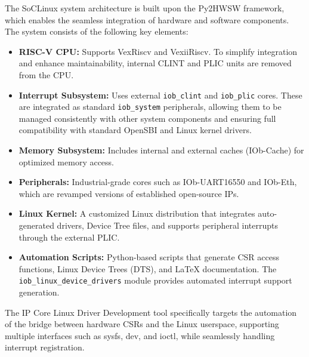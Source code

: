 %

The SoCLinux system architecture is built upon the Py2HWSW framework, which enables the seamless integration of hardware and software components. The system consists of the following key elements:

\begin{itemize}
    \item \textbf{RISC-V CPU:} Supports VexRiscv and VexiiRiscv. To simplify integration and enhance maintainability, internal CLINT and PLIC units are removed from the CPU.
    \item \textbf{Interrupt Subsystem:} Uses external \texttt{iob\_clint} and \texttt{iob\_plic} cores. These are integrated as standard \texttt{iob\_system} peripherals, allowing them to be managed consistently with other system components and ensuring full compatibility with standard OpenSBI and Linux kernel drivers.
    \item \textbf{Memory Subsystem:} Includes internal and external caches (IOb-Cache) for optimized memory access.
    \item \textbf{Peripherals:} Industrial-grade cores such as IOb-UART16550 and IOb-Eth, which are revamped versions of established open-source IPs.
    \item \textbf{Linux Kernel:} A customized Linux distribution that integrates auto-generated drivers, Device Tree files, and supports peripheral interrupts through the external PLIC.
    \item \textbf{Automation Scripts:} Python-based scripts that generate CSR access functions, Linux Device Trees (DTS), and LaTeX documentation. The \texttt{iob\_linux\_device\_drivers} module provides automated interrupt support generation.
\end{itemize}

The IP Core Linux Driver Development tool specifically targets the automation of the bridge between hardware CSRs and the Linux userspace, supporting multiple interfaces such as sysfs, dev, and ioctl, while seamlessly handling interrupt registration.

\clearpage
